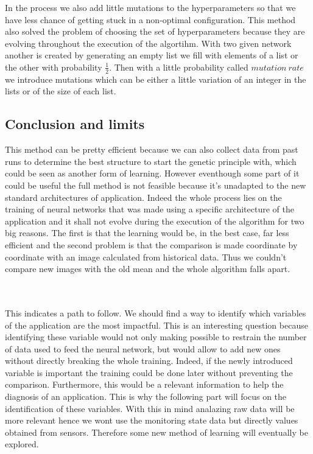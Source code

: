 \documentclass[10pt,a4paper,oneside]{article}
\begin{document}
\begin{multicols}{2}
In the process we also add little mutations to the hyperparameters so that we have less chance of getting stuck in a non-optimal configuration. This method also solved the problem of choosing the set of hyperparameters because they are evolving throughout the execution of the algortihm.
With two given network another is created by generating an empty list we fill with elements of a list or the other with probability $\frac{1}{2}$. Then with a little probability called $mutation ~rate$ we introduce mutations which can be either a little variation of an integer in the lists or of the size of each list.

\subsection{Conclusion and limits}
This method can be pretty efficient because we can also collect data from past runs to determine the best structure to start the genetic principle with, which could be seen as another form of learning. However eventhough some part of it could be useful the full method is not feasible because it's unadapted to the new standard architectures of application. Indeed the whole process lies on the training of neural networks that was made using a specific architecture of the application and it shall not evolve during the execution of the algorithm for two big reasons. The first is that the learning would be, in the best case, far less efficient and the second problem is that the comparison is made coordinate by coordinate with an image calculated from historical data. Thus we couldn't compare new images with the old mean and the whole algorithm falls apart.

\\ \\This indicates a path to follow. We should find a way to identify which variables of the application are the most impactful. This is an interesting question because identifying these variable would not only making possible to restrain the number of data used to feed the neural network, but would allow to add new ones without directly breaking the whole training. Indeed, if the newly introduced variable is important the training could be done later without preventing the comparison. Furthermore, this would be a relevant information to help the diagnosis of an application. This is why the following part will focus on the identification of these variables. With this in mind analazing raw data will be more relevant hence we wont use the monitoring state data but directly values obtained from sensors. Therefore some new method of learning will eventually be explored.


\end{multicols}
\end{document}
